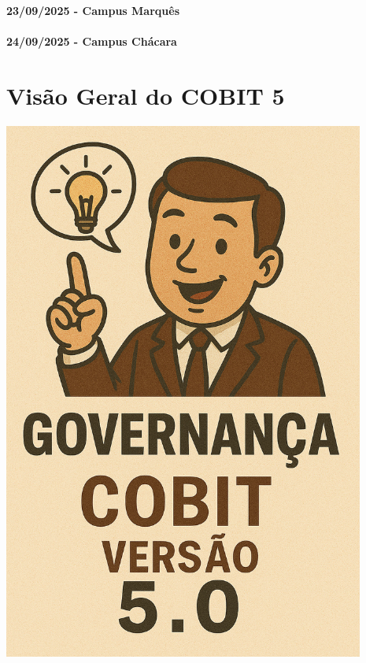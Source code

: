 \documentclass[
]{book}
\begin{document}
\subsubsection*{23/09/2025 - Campus Marquês}\label{campus-marquuxeas-6}

\subsubsection*{24/09/2025 - Campus Chácara}\label{campus-chuxe1cara-6}

\chapter{Visão Geral do COBIT 5}\label{visuxe3o-geral-do-cobit-5}

\includegraphics[width=4.67708in,height=\textheight]{images/07-2025-09-23_24/00-cobit_versao_5.jpg}
\end{document}
